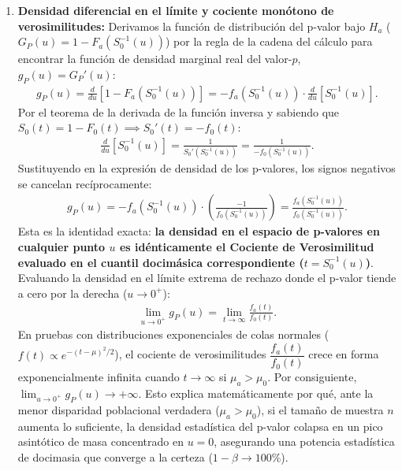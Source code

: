 \begin{solproblema}
\begin{enumerate}
		\item \textbf{Densidad diferencial en el límite y cociente monótono de verosimilitudes:}
		Derivamos la función de distribución del p-valor bajo $H_a$ ($G_P(u) = 1 - F_a(S_0^{-1}(u))$) por la regla de la cadena del cálculo para encontrar la función de densidad marginal real del valor-$p$, $g_P(u) = G_P'(u)$:
		\begin{align}
			g_P(u) = \frac{d}{du}\left[ 1 - F_a\left( S_0^{-1}(u) \right) \right] = -f_a\left( S_0^{-1}(u) \right) \cdot \frac{d}{du}\left[ S_0^{-1}(u) \right].
		\end{align}
		Por el teorema de la derivada de la función inversa y sabiendo que $S_0(t) = 1 - F_0(t) \implies S_0'(t) = -f_0(t)$:
		\begin{align}
			\frac{d}{du}\left[ S_0^{-1}(u) \right] = \frac{1}{S_0'\left( S_0^{-1}(u) \right)} = \frac{1}{-f_0\left( S_0^{-1}(u) \right)}.
		\end{align}
		Sustituyendo en la expresión de densidad de los p-valores, los signos negativos se cancelan recíprocamente:
		\begin{align}
			g_P(u) = -f_a\left( S_0^{-1}(u) \right) \cdot \left( \frac{-1}{f_0\left( S_0^{-1}(u) \right)} \right) = \frac{f_a\left( S_0^{-1}(u) \right)}{f_0\left( S_0^{-1}(u) \right)}.
		\end{align}
		Esta es la identidad exacta: \textbf{la densidad en el espacio de p-valores en cualquier punto $u$ es idénticamente el Cociente de Verosimilitud evaluado en el cuantil docimásica correspondiente ($t = S_0^{-1}(u)$)}.
		Evaluando la densidad en el límite extrema de rechazo donde el p-valor tiende a cero por la derecha ($u \to 0^+$):
		\begin{align}
			\lim_{u \to 0^+} g_P(u) = \lim_{t \to \infty} \frac{f_a(t)}{f_0(t)}.
		\end{align}
		En pruebas con distribuciones exponenciales de colas normales ($f(t) \propto e^{-(t-\mu)^2/2}$), el cociente de verosimilitudes $\dfrac{f_a(t)}{f_0(t)}$ crece en forma exponencialmente infinita cuando $t \to \infty$ si $\mu_a > \mu_0$.
		Por consiguiente, $\lim_{u \to 0^+} g_P(u) \to +\infty$.
		Esto explica matemáticamente por qué, ante la menor disparidad poblacional verdadera ($\mu_a > \mu_0$), si el tamaño de muestra $n$ aumenta lo suficiente, la densidad estadística del p-valor colapsa en un pico asintótico de masa concentrado en $u = 0$, asegurando una potencia estadística de docimasia que converge a la certeza ($1-\beta \to 100\%$).
	\end{enumerate}
\end{solproblema}
